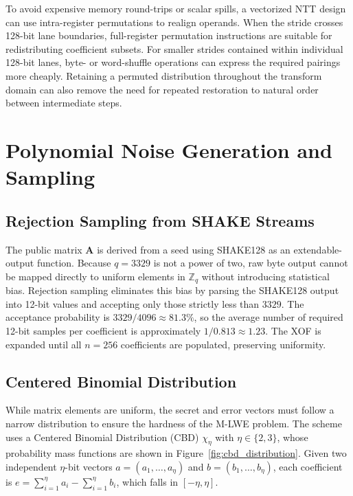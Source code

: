 To avoid expensive memory round-trips or scalar spills, a vectorized NTT design can use intra-register permutations to realign operands. When the stride crosses 128-bit lane boundaries, full-register permutation instructions are suitable for redistributing coefficient subsets. For smaller strides contained within individual 128-bit lanes, byte- or word-shuffle operations can express the required pairings more cheaply. Retaining a permuted distribution throughout the transform domain can also remove the need for repeated restoration to natural order between intermediate steps.

\section{Polynomial Noise Generation and Sampling}
\label{sec:poly_noise_generation_sampling}

\subsection{Rejection Sampling from SHAKE Streams}
\label{sub:rejection_sampling_shake}

The public matrix $\mathbf{A}$ is derived from a seed using SHAKE128 as an extendable-output function. Because $q = 3329$ is not a power of two, raw byte output cannot be mapped directly to uniform elements in $\mathbb{Z}_q$ without introducing statistical bias. Rejection sampling eliminates this bias by parsing the SHAKE128 output into 12-bit values and accepting only those strictly less than $3329$. The acceptance probability is $3329 / 4096 \approx 81.3\%$, so the average number of required 12-bit samples per coefficient is approximately $1 / 0.813 \approx 1.23$. The XOF is expanded until all $n = 256$ coefficients are populated, preserving uniformity.

\subsection{Centered Binomial Distribution}
\label{sub:cbd_sampling}

While matrix elements are uniform, the secret and error vectors must follow a narrow distribution to ensure the hardness of the M-LWE problem. The scheme uses a Centered Binomial Distribution (CBD) $\chi_\eta$ with $\eta \in \{2, 3\}$, whose probability mass functions are shown in Figure~\ref{fig:cbd_distribution}. Given two independent $\eta$-bit vectors $a = (a_1, \dots, a_\eta)$ and $b = (b_1, \dots, b_\eta)$, each coefficient is $e = \sum_{i=1}^\eta a_i - \sum_{i=1}^\eta b_i$, which falls in $[-\eta, \eta]$.

